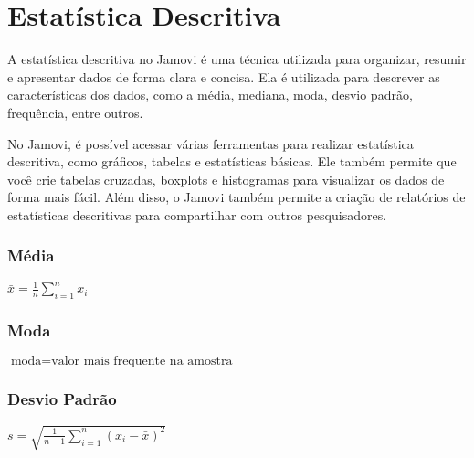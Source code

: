 \chapter{Estatística Descritiva}

A estatística descritiva no Jamovi é uma técnica utilizada para organizar, resumir e apresentar dados de forma clara e concisa. Ela é utilizada para descrever as características dos dados, como a média, mediana, moda, desvio padrão, frequência, entre outros.

No Jamovi, é possível acessar várias ferramentas para realizar estatística descritiva, como gráficos, tabelas e estatísticas básicas. Ele também permite que você crie tabelas cruzadas, boxplots e histogramas para visualizar os dados de forma mais fácil. Além disso, o Jamovi também permite a criação de relatórios de estatísticas descritivas para compartilhar com outros pesquisadores.

\subsection{Média}



$\bar{x} = \frac{1}{n} \sum_{i=1}^{n} x_i$


\subsection{Moda}

$\text{moda} = \text{valor mais frequente na amostra}$

\subsection{Desvio Padrão}

$s = \sqrt{\frac{1}{n-1} \sum_{i=1}^{n} (x_i - \bar{x})^2}$
